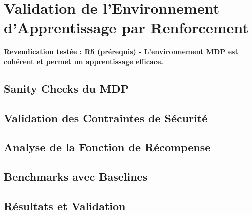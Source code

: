 \section{Validation de l'Environnement d'Apprentissage par Renforcement}
\label{sec:validation_env_rl}

\textbf{Revendication testée : R5 (prérequis) - L'environnement MDP est cohérent et permet un apprentissage efficace.}

\subsection{Sanity Checks du MDP}
\label{subsec:sanity_checks_mdp}

\subsection{Validation des Contraintes de Sécurité}
\label{subsec:contraintes_securite}

\subsection{Analyse de la Fonction de Récompense}
\label{subsec:analyse_recompense}

\subsection{Benchmarks avec Baselines}
\label{subsec:benchmarks_baselines}

\subsection{Résultats et Validation}
\label{subsec:resultats_env_rl}

